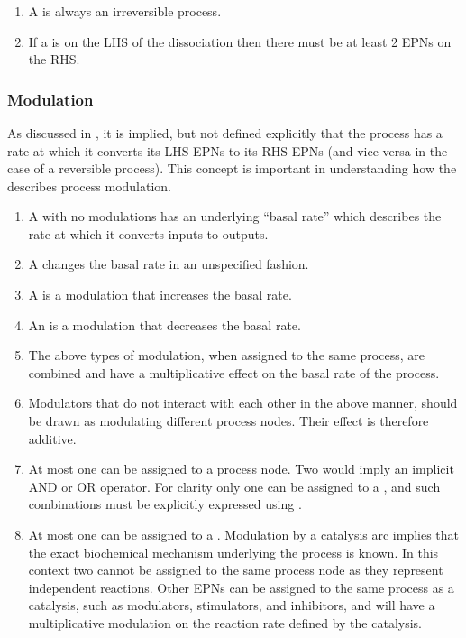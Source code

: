 \subsubsection{}
  \begin{enumerate}
    \item A  is always an irreversible process.
    \item If a  is on the LHS of the dissociation then there must be at least 2 EPNs on the RHS.
\end{enumerate}  

\subsubsection{Modulation}
\label{sec:mod-semantics}

As discussed in , it is implied, but not defined explicitly that the process has a rate at
which it converts its LHS EPNs to its RHS EPNs (and vice-versa in the case of a reversible process). This concept is
important in understanding how the \PDl describes process modulation.

\begin{enumerate}
\item A  with no modulations has an underlying ``basal rate''
  which describes the rate at which it converts inputs to outputs.
\item A  changes the basal rate in an unspecified fashion.
\item A  is a modulation that increases the basal rate.
\item An  is a modulation that decreases the basal rate.
\item The above types of modulation, when assigned to the same process, are combined and have a multiplicative effect on the basal rate of the process.
\item Modulators that do not interact with each other in the above manner, should be drawn as modulating different process nodes. Their effect is therefore additive.
\item At most one  can be assigned to a process node. Two 
  would imply an implicit AND or OR operator. For clarity only
  one  can be assigned to a , and such combinations must be
  explicitly expressed using . 
\item At most one  can be assigned to a
  . Modulation by a catalysis arc implies that the exact biochemical mechanism underlying
  the process is known. In this context two  cannot
  be assigned to the same process node as they represent
  independent reactions. Other EPNs can be assigned to the same process as a catalysis, such as modulators, stimulators, and
  inhibitors, and will have a multiplicative modulation on the reaction rate defined by the catalysis.
\end{enumerate}

